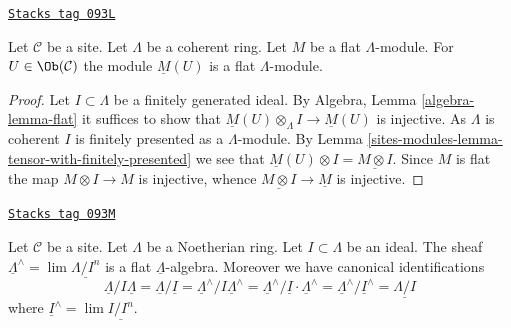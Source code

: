 \begin{lemma}
\label{sites-modules-lemma-flat-sections}
\href{https://stacks.math.columbia.edu/tag/093L}{\texttt{Stacks tag 093L}}

Let $\mathcal{C}$ be a site. Let $\Lambda$ be a coherent ring.
Let $M$ be a flat $\Lambda$-module. For $U \in \Ob(\mathcal{C})$ the
module $\underline{M}(U)$ is a flat $\Lambda$-module.
\end{lemma}

\begin{proof}
Let $I \subset \Lambda$ be a finitely generated ideal.
By Algebra, Lemma \ref{algebra-lemma-flat} it suffices to show that
$\underline{M}(U) \otimes_\Lambda I \to \underline{M}(U)$
is injective. As $\Lambda$ is coherent $I$ is finitely presented as
a $\Lambda$-module. By Lemma \ref{sites-modules-lemma-tensor-with-finitely-presented}
we see that $\underline{M}(U) \otimes I = \underline{M \otimes I}$.
Since $M$ is flat the map $M \otimes I \to M$ is injective,
whence $\underline{M \otimes I} \to \underline{M}$ is injective.
\end{proof}

\begin{lemma}
\label{sites-modules-lemma-completion-flat}
\href{https://stacks.math.columbia.edu/tag/093M}{\texttt{Stacks tag 093M}}

Let $\mathcal{C}$ be a site. Let $\Lambda$ be a Noetherian ring.
Let $I \subset \Lambda$ be an ideal. The sheaf
$\underline{\Lambda}^\wedge = \lim \underline{\Lambda/I^n}$
is a flat $\underline{\Lambda}$-algebra.
Moreover we have canonical identifications
$$
\underline{\Lambda}/I\underline{\Lambda} =
\underline{\Lambda}/\underline{I} =
\underline{\Lambda}^\wedge/I\underline{\Lambda}^\wedge =
\underline{\Lambda}^\wedge/\underline{I} \cdot \underline{\Lambda}^\wedge =
\underline{\Lambda}^\wedge/\underline{I}^\wedge =
\underline{\Lambda/I}
$$
where $\underline{I}^\wedge = \lim \underline{I/I^n}$.
\end{lemma}

